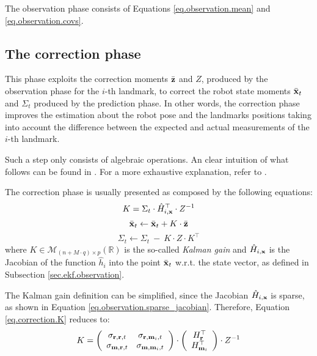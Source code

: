	\vspace{1cm}
	\begin{recap}
		The observation phase consists of Equations \ref{eq.observation.mean} and \ref{eq.observation.covs}.
	\end{recap}
	
\subsection{The correction phase}
	This phase exploits the correction moments $\bar{\boldsymbol{\mathrm{{z}}}}$ and $Z$, produced by the observation phase for the $i$-th landmark, to correct the robot state moments $\bar{\boldsymbol{\mathrm{{x}}}}_t$ and $\Sigma_t$ produced by the prediction phase. 
	In other words, the correction phase improves the estimation about the robot pose and the landmarks positions taking into account the difference between the expected and actual measurements of the $i$-th landmark.
	
	Such a step only consists of algebraic operations. 
	An clear intuition of what follows can be found in \cite[Unit C]{brenner204}.
	For a more exhaustive explanation, refer to \cite[Ch. 3]{thrun2005}.
	
	The correction phase is usually presented as composed by the following equations:
	\begin{equation}
		\label{eq.correction.K}
		K = \Sigma_t \cdot \hat{H}^\top_{i,\boldsymbol{\mathrm{{x}}}} \cdot Z^{-1}
	\end{equation}
	\begin{equation}
		\label{eq.correction.x}
		\bar{\boldsymbol{\mathrm{{x}}}}_t \leftarrow \bar{\boldsymbol{\mathrm{{x}}}}_t + K \cdot \bar{\boldsymbol{\mathrm{{z}}}}
	\end{equation}
	\begin{equation}
		\label{eq.correction.Sigma}
		\Sigma_t \leftarrow \Sigma_t \ - \ K \cdot Z \cdot K^\top
	\end{equation}
	where $K \in \mathcal{M}_{(n + M \cdot q) \times p}(\mathbb{R})$ is the so-called \emph{Kalman gain} and $\hat{H}_{i,\boldsymbol{\mathrm{{x}}}}$ is the Jacobian of the function $\hat{h}_i$ into the point $\bar{\boldsymbol{\mathrm{{x}}}}_t$ w.r.t. the state vector, as defined in Subsection \ref{sec.ekf.observation}.
	
	The Kalman gain definition can be simplified, since the Jacobian $\hat{H}_{i,\boldsymbol{\mathrm{{x}}}}$ is sparse, as shown in Equation \ref{eq.observation.sparse_jacobian}.
	Therefore, Equation \ref{eq.correction.K} reduces to:
	\begin{equation}
		\label{eq.correction.kalman_gain}
		K = 
		\left(\begin{array}{cc}
			\sigma_{\boldsymbol{\mathrm{{r}}}, \boldsymbol{\mathrm{{r}}}, t} & \sigma_{\boldsymbol{\mathrm{{r}}}, \boldsymbol{\mathrm{{m}}}_i, t} \\
			\sigma_{\boldsymbol{\mathrm{{m}}}, \boldsymbol{\mathrm{{r}}}, t} & \sigma_{\boldsymbol{\mathrm{{m}}}, \boldsymbol{\mathrm{{m}}}_i, t}
		\end{array}\right)
		\cdot
		\left(\begin{array}{c}
			H^\top_{\boldsymbol{\mathrm{{r}}}} \\ H^\top_{\boldsymbol{\mathrm{{m}}}_i}
		\end{array}\right)
		\cdot
		Z^{-1}
	\end{equation}
	
